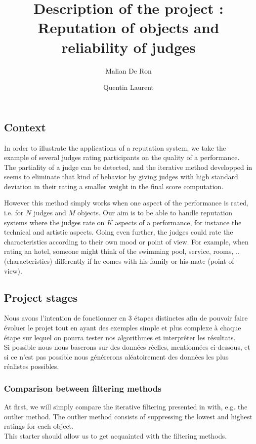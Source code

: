 \documentclass[12pt,a4paper,notitlepage]{article}
\title{Description of the project : Reputation of objects and reliability of judges}
\author{Malian De Ron \and Quentin Laurent}
\begin{document}
\maketitle

\subsection*{Context}
In order to illustrate the applications of a reputation system, we take the example of several judges rating participants on the quality of a performance. The partiality of a judge can be detected, and the iterative method developped in \cite{Cristo1} seems to eliminate that kind of behavior by giving judges with high standard deviation in their rating a smaller weight in the final score computation.

However this method simply works when one aspect of the performance is rated, i.e. for $N$ judges and $M$ objects. Our aim is to be able to handle reputation systems where the judges rate on $K$ aspects of a performance, for instance the technical and artistic aspects. 
Going even further, the judges could rate the characteristics according to their own mood or point of view. For example, when rating an hotel, someone might think of the swimming pool, service, rooms, .. (characteristics) differently if he comes with his family or his mate (point of view).

\subsection*{Project stages}

Nous avons l'intention de fonctionner en 3 étapes distinctes afin de pouvoir faire évoluer le projet tout en ayant des exemples simple et plus complexe à chaque étape sur lequel on pourra tester nos algorithmes et interprêter les résultats.\\

Si possible nous nous baserons sur des données réelles, mentionnées ci-dessous, et si ce n'est pas possible nous générerons aléatoirement des données les plus réalistes possibles.

\subsubsection*{Comparison between filtering methods}
At first, we will simply compare the iterative filtering presented in \cite{Cristo1} 
 with, e.g. the outlier method. The outlier method consists of suppressing the lowest and highest ratings for each object.\\
 This starter should allow us to get acquainted with the filtering methods.
\end{document}
